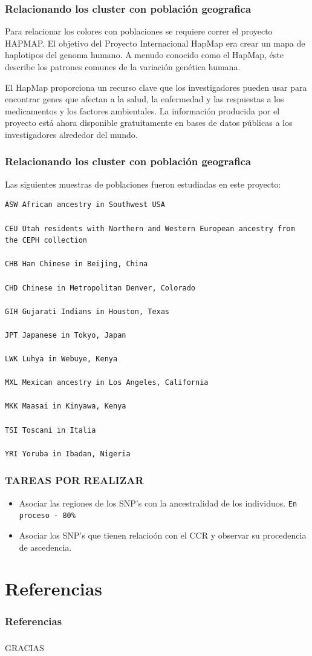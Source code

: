 \documentclass[serif,9pt]{beamer}
\theoremstyle{definition}
\theoremstyle{remark}
\begin{document}
\begin{frame}\frametitle{Relacionando los cluster con poblaci\'on geografica}

  Para relacionar los colores con poblaciones se requiere correr el proyecto HAPMAP. El objetivo del Proyecto Internacional HapMap era crear un mapa de haplotipos del genoma humano. A menudo conocido como el HapMap, éste describe los patrones comunes de la variación genética humana.

El HapMap proporciona un recurso clave que los investigadores pueden usar para encontrar genes que afectan a la salud, la enfermedad y las respuestas a los medicamentos y los factores ambientales. La información producida por el proyecto está ahora disponible gratuitamente en bases de datos públicas a los investigadores alrededor del mundo.
\end{frame}

\begin{frame}\frametitle{Relacionando los cluster con poblaci\'on geografica}
  Las siguientes muestras de poblaciones fueron estudiadas en este proyecto:

\begin{verbatim}
ASW African ancestry in Southwest USA

CEU Utah residents with Northern and Western European ancestry from the CEPH collection

CHB Han Chinese in Beijing, China

CHD Chinese in Metropolitan Denver, Colorado

GIH Gujarati Indians in Houston, Texas

JPT Japanese in Tokyo, Japan

LWK Luhya in Webuye, Kenya

MXL Mexican ancestry in Los Angeles, California

MKK Maasai in Kinyawa, Kenya

TSI Toscani in Italia

YRI Yoruba in Ibadan, Nigeria 
\end{verbatim}
\end{frame}

\begin{frame}\frametitle{TAREAS POR REALIZAR}
   \begin{itemize}
   \item Asociar las regiones de los SNP's con la ancestralidad de los individuos. \texttt{En proceso - 80\%}
   \item Asociar los SNP's que tienen relacio\'on con el CCR y observar su procedencia de ascedencia.
  \end{itemize}

\end{frame}



\section{Referencias}
\begin{frame}[fragile]\frametitle{Referencias}
  
    
\end{frame}



\begin{frame}[fragile]\frametitle{}

\begin{center}
  GRACIAS
\end{center}
\end{frame}
\end{document}
